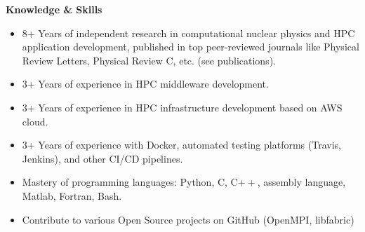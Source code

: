 \documentclass[letterpaper,12pt]{article}
\newcommand{\resheading}[1]{{\large \colorbox{mygrey}{\begin{minipage}{\textwidth}{\textbf{#1 \vphantom{p\^{E}}}}\end{minipage}}}}
\begin{document}
				


\resheading{Knowledge \& Skills}
\begin{itemize}
\itemsep0em
	\item
	8+ Years of independent research in computational nuclear physics and HPC application development, published in top peer-reviewed journals like Physical Review Letters, Physical Review C, etc. (see publications).
	\item
	3+ Years of experience in HPC middleware development.
	\item
    3+ Years of experience in HPC infrastructure development based on AWS cloud. 
    \item
     3+ Years of experience with Docker, automated testing platforms (Travis, Jenkins), and other CI/CD pipelines.
	\item
	Mastery of programming languages: Python,  C, C$++$, assembly language, Matlab, Fortran, Bash.
	\item
	Contribute to various Open Source projects on GitHub (OpenMPI, libfabric)
	
	
\end{itemize}



\end{document}
